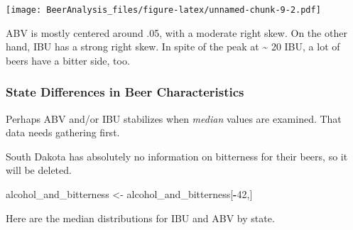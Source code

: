 \documentclass[]{article}
\newenvironment{Shaded}{\begin{snugshade}}{\end{snugshade}}
\newcommand{\DataTypeTok}[1]{\textcolor[rgb]{0.13,0.29,0.53}{#1}}
\newcommand{\DecValTok}[1]{\textcolor[rgb]{0.00,0.00,0.81}{#1}}
\newcommand{\KeywordTok}[1]{\textcolor[rgb]{0.13,0.29,0.53}{\textbf{#1}}}
\newcommand{\NormalTok}[1]{#1}
\newcommand{\OperatorTok}[1]{\textcolor[rgb]{0.81,0.36,0.00}{\textbf{#1}}}
\newcommand{\StringTok}[1]{\textcolor[rgb]{0.31,0.60,0.02}{#1}}
\begin{document}
\texttt{[image: BeerAnalysis\_files/figure-latex/unnamed-chunk-9-2.pdf]}

ABV is mostly centered around .05, with a moderate right skew. On the
other hand, IBU has a strong right skew. In spite of the peak at
\textasciitilde{} 20 IBU, a lot of beers have a bitter side, too.

\hypertarget{state-differences-in-beer-characteristics}{%
\subsubsection{State Differences in Beer
Characteristics}\label{state-differences-in-beer-characteristics}}

Perhaps ABV and/or IBU stabilizes when \emph{median} values are
examined. That data needs gathering first.

\begin{Shaded}
\end{Shaded}

South Dakota has absolutely no information on bitterness for their
beers, so it will be deleted.

\begin{Shaded}
\begin{Highlighting}[]
\NormalTok{alcohol_and_bitterness <-}\StringTok{ }\NormalTok{alcohol_and_bitterness[}\OperatorTok{-}\DecValTok{42}\NormalTok{,]}
\end{Highlighting}
\end{Shaded}

Here are the median distributions for IBU and ABV by state.
\end{document}
